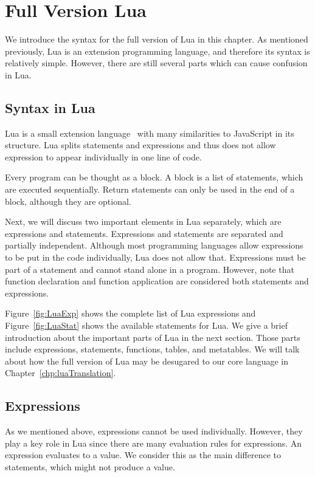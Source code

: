 \chapter{Full Version Lua}
We introduce the syntax for the full version of Lua in this chapter. As mentioned previously, Lua is an extension programming language, and therefore its syntax is relatively simple. However, there are still several parts which can cause confusion in Lua.

\section{Syntax in Lua}
Lua is a small extension language~\cite{PIL} with many similarities to JavaScript in its structure.  Lua splits statements and expressions and thus does not allow expression to appear individually in one line of code.

Every program can be thought as a block. A block is a list of statements, which are executed sequentially. Return statements can only be used in the end of a block, although they are optional.

Next, we will discuss two important elements in Lua separately, which are expressions and statements.
Expressions and statements are separated and partially independent. Although most programming languages allow expressions to be put in the code individually, Lua does not allow that. Expressions must be part of a statement and cannot stand alone in a program. However, note that function declaration and function application are considered both statements and expressions.

Figure~\ref{fig:LuaExp} shows the complete list of Lua expressions
and Figure~\ref{fig:LuaStat} shows the available statements for Lua.
We give a brief introduction about the important parts of Lua in the next section. Those parts include expressions, statements, functions, tables, and metatables. We will talk about how the full version of Lua may be desugared to our core language in Chapter~\ref{chp:luaTranslation}.


\newcommand{\syntax}[2]{{\tt #1}{\tt ~::=}{\tt ~~#2}\\}

\newcommand{\syntaxcase}[1]{{\tt \quad\quad\quad\quad\quad\quad~}{\tt ~~#1}\\}

\section{Expressions}
As we mentioned above, expressions cannot be used individually. However, they play a key role in Lua since there are many evaluation rules for expressions. An expression evaluates to a value. We consider this as the main difference to statements,
which might not produce a value.

